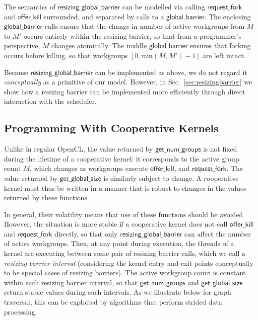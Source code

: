 \documentclass[sigconf]{acmart}
\newcommand{\mysec}{Sec.~}
\newcommand{\offerfork}{\mathsf{request\_fork}}
\newcommand{\offerkill}{\mathsf{offer\_kill}}
\newcommand{\globalbarrier}{\mathsf{global\_barrier}}
\newcommand{\resizingglobalbarrier}{\mathsf{resizing\_global\_barrier}}
\newcommand{\getnumgroups}{\mathsf{get\_num\_groups}}
\newcommand{\getglobalsize}{\mathsf{get\_global\_size}}
\begin{document}
{The semantics of $\resizingglobalbarrier$ can be modelled via calling $\offerfork$ and $\offerkill$
surrounded, and separated by calls to a $\globalbarrier$.
%
%
The enclosing $\globalbarrier$ calls ensure that the change in number
of active workgroups from $M$ to $M'$ occurs entirely within the
resizing barrier, so that from a programmer's perspective, $M$ changes atomically.  The middle $\globalbarrier$ ensures that forking occurs before killing, so that workgroups $[0, \textrm{min}(M, M') - 1]$ are left intact.

Because $\resizingglobalbarrier$ can be implemented as above, we do not regard it \emph{conceptually} as a primitive of our
model.  However, in
\mysec\ref{sec:resizingbarrier} we show how a resizing barrier can be
implemented more efficiently through direct interaction with the scheduler.

\subsection{Programming With Cooperative Kernels}\label{sec:programmingguidelines}


 Unlike in regular OpenCL, the
value returned by $\getnumgroups$ is not fixed during the lifetime of
a cooperative kernel: it corresponds to the active group count $M$,
which changes as workgroups execute $\offerkill$, and $\offerfork$.
The value returned by $\getglobalsize$ is similarly subject to change.
A cooperative kernel must thus be written in a manner that is robust
to changes in the values returned by these functions.

In general, their volatility means that use of these functions should
be avoided.  However, the situation is more stable if a cooperative
kernel does not call $\offerkill$ and $\offerfork$ directly, so that
only $\resizingglobalbarrier$ can affect the number of active
workgroups.  Then, at any point during execution, the threads of a
kernel are executing between some pair of resizing barrier calls,
which we call a \emph{resizing barrier interval} (considering the
kernel entry and exit points conceptually to be special cases of
resizing barriers).  The active workgroup count is constant within
each resizing barrier interval, so that $\getnumgroups$ and
$\getglobalsize$ return stable values during such intervals.
%
As we illustrate below for graph traversal, this can be exploited by algorithms that perform strided
data processing.


}
\end{document}
